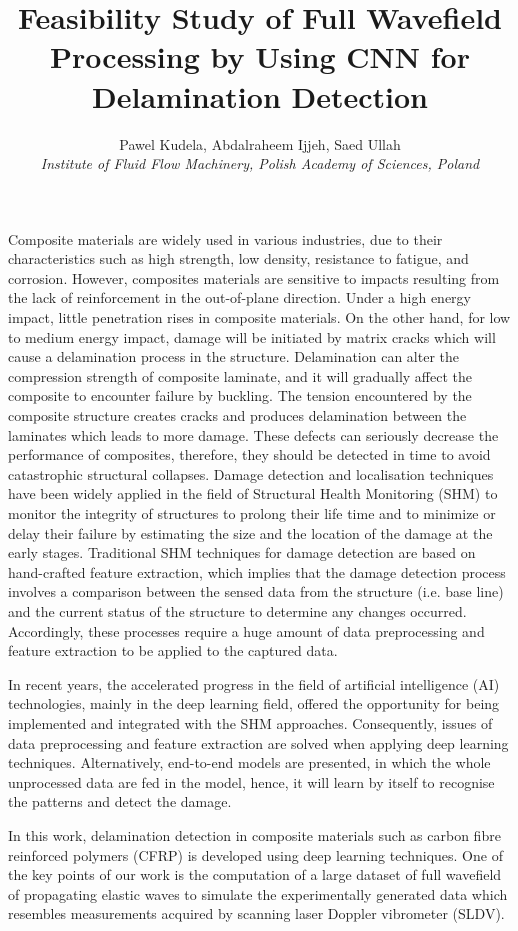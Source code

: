 \documentclass[11pt,a4paper]{article}
\title{Feasibility Study of Full Wavefield Processing by Using CNN for Delamination Detection}
\author{Pawel Kudela, Abdalraheem Ijjeh, Saed Ullah \\
	\footnotesize\textit{Institute of Fluid Flow Machinery, Polish Academy of Sciences, Poland} 
	}
\begin{document}
	\maketitle
	Composite materials are widely used in various industries, due to their characteristics such as high strength, low density, resistance to fatigue, and corrosion.  
	However, composites materials are sensitive to impacts resulting from the lack of reinforcement in the out-of-plane direction. 
	Under a high energy impact, little penetration rises in composite materials. On the other hand, for low to medium energy impact, damage will be initiated by matrix cracks which will cause a delamination process in the structure. 
	Delamination can alter the compression strength of composite laminate, and it will gradually affect the composite to encounter failure by buckling. 
	The tension encountered by the composite structure creates cracks and produces delamination between the laminates which leads to more damage. These defects can seriously decrease the performance of composites,  therefore, they should be detected in time to avoid catastrophic structural collapses.
	Damage detection and localisation techniques have been widely applied in the field of Structural Health Monitoring (SHM) to monitor the integrity of structures to prolong their life time and  to minimize or delay their failure by estimating the size and the location of the damage at the early stages.
	Traditional SHM techniques for damage detection are based on hand-crafted feature extraction, which implies that the damage detection process involves a comparison between the sensed data from the structure (i.e. base line) and the current status of the structure to determine any changes occurred. Accordingly, these processes require a huge amount of data preprocessing and feature extraction to be applied to the captured data. 
	
	In recent years, the accelerated progress in the field of artificial intelligence (AI) technologies, mainly in the deep learning field, offered the opportunity for being implemented and integrated with the SHM approaches.
	Consequently, issues of data preprocessing and feature extraction are solved when applying deep learning techniques. 
	Alternatively, end-to-end models are presented, in which the whole unprocessed data are fed in the model, hence, it will learn by itself to recognise the patterns and detect the damage.

	In this work, delamination detection in composite materials such as carbon fibre reinforced polymers (CFRP) is developed using deep learning techniques. 
	One of the key points of our work is the computation of a large dataset of full wavefield of propagating elastic waves to simulate the experimentally generated data which resembles measurements acquired by scanning laser Doppler vibrometer (SLDV).
	
\end{document}
